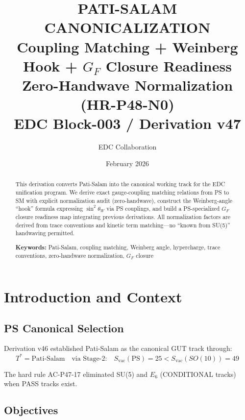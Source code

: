 \documentclass[11pt,a4paper]{article}
\title{\textbf{PATI-SALAM CANONICALIZATION}\\[0.5em]
\large Coupling Matching + Weinberg Hook + $G_F$ Closure Readiness\\[0.5em]
\small Zero-Handwave Normalization (HR-P48-N0)\\[0.5em]
\normalsize EDC Block-003 / Derivation v47}
\author{EDC Collaboration}
\date{February 2026}
\begin{document}
\maketitle

\begin{abstract}
This derivation converts Pati-Salam into the canonical working track for the
EDC unification program. We derive exact gauge-coupling matching relations
from PS to SM with explicit normalization audit (zero-handwave), construct the
Weinberg-angle ``hook'' formula expressing $\sin^2\theta_W$ via PS couplings,
and build a PS-specialized $G_F$ closure readiness map integrating previous
derivations. All normalization factors are derived from trace conventions and
kinetic term matching---no ``known from SU(5)'' handwaving permitted.

\textbf{Keywords:} Pati-Salam, coupling matching, Weinberg angle, hypercharge,
trace conventions, zero-handwave normalization, $G_F$ closure
\end{abstract}

\tableofcontents
\newpage

\section{Introduction and Context}
\label{sec:intro}

\subsection{PS Canonical Selection}
\label{subsec:ps-selection}

Derivation v46 established Pati-Salam as the canonical GUT track through:
\begin{equation}
\label{eq:ps-selection}
T^* = \text{Pati-Salam} \quad \text{via Stage-2:} \quad S_{\text{vac}}(\text{PS}) = 25 < S_{\text{vac}}(SO(10)) = 49
\end{equation}

The hard rule AC-P47-17 eliminated SU(5) and $E_6$ (CONDITIONAL tracks) when
PASS tracks exist.



\subsection{Objectives}
\label{subsec:objectives}
\end{document}
